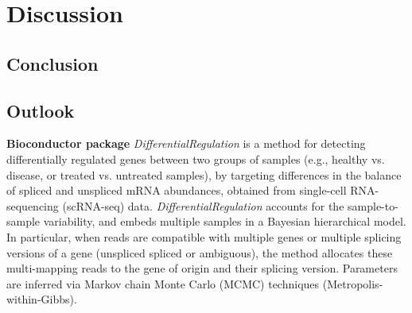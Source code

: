 

\chapter{Discussion}

\section{Conclusion}

\section{Outlook}

\textbf{Bioconductor package} \emph{DifferentialRegulation} \citep{DifferentialRegulation} is a method for detecting differentially regulated genes between two groups of samples (e.g., healthy vs. disease, or treated vs. untreated samples), by targeting differences in the balance of spliced and unspliced mRNA abundances, obtained from single-cell RNA-sequencing (scRNA-seq) data. \emph{DifferentialRegulation} accounts for the sample-to-sample variability, and embeds multiple samples in a Bayesian hierarchical model. In particular, when reads are compatible with multiple genes or multiple splicing versions of a gene (unspliced spliced or ambiguous), the method allocates these multi-mapping reads to the gene of origin and their splicing version. Parameters are inferred via Markov chain Monte Carlo (MCMC) techniques (Metropolis-within-Gibbs).
